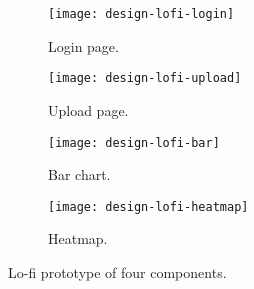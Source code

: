 \begin{figure}[H]
    \centering
    \begin{subfigure}{.49\textwidth}
        \centering
        \texttt{[image: design-lofi-login]}
        \caption{Login page.
        }\label{subfig:lofi-login}
    \end{subfigure}
    \begin{subfigure}{.49\textwidth}
        \centering
        \texttt{[image: design-lofi-upload]}
        \caption{Upload page.
        }\label{subfig:lofi-upload}
    \end{subfigure}
    \par\medskip
    \begin{subfigure}{.49\textwidth}
        \centering
        \texttt{[image: design-lofi-bar]}
        \caption{Bar chart.
        }\label{subfig:lofi-bar}
    \end{subfigure}
    \begin{subfigure}{.49\textwidth}
        \centering
        \texttt{[image: design-lofi-heatmap]}
        \caption{Heatmap.
        }\label{subfig:lofi-heatmap}
    \end{subfigure}
    \caption{Lo-fi prototype of four components.
    }\label{fig:lofi-prototype}
\end{figure}
